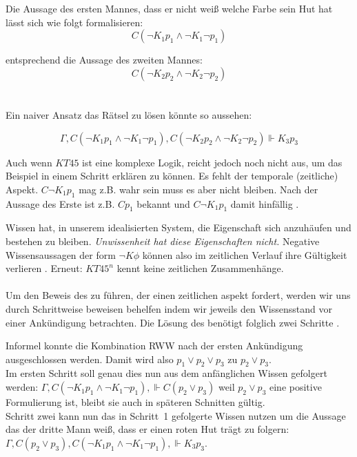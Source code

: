 Die Aussage des ersten Mannes, dass er nicht weiß welche Farbe sein Hut hat lässt sich wie folgt formalisieren:
\begin{equation*}
	C(\neg K_1 p_1 \wedge \neg K_1 \neg p_1)
\end{equation*}

entsprechend die Aussage des zweiten Mannes:
\begin{equation*}
	C(\neg K_2 p_2 \wedge \neg K_2 \neg p_2)
\end{equation*}
\\\\

Ein naiver Ansatz das Rätsel zu lösen könnte so aussehen:

\begin{equation}
	\Gamma, C(\neg K_1 p_1 \wedge \neg K_1 \neg p_1), C(\neg K_2 p_2 \wedge \neg K_2 \neg p_2) \Vdash K_3 p_3
\end{equation}

Auch wenn $KT45$ ist eine komplexe Logik, reicht jedoch noch nicht aus, um das Beispiel in einem Schritt erklären zu können.
Es fehlt der temporale (zeitliche) Aspekt.
$C \neg K_1 p_1$ mag z.B. wahr sein muss es aber nicht bleiben.
Nach der Aussage des Erste ist z.B. $C p_1$ bekannt und $C \neg K_1 p_1$ damit hinfällig .

Wissen hat, in unserem idealisierten System, die Eigenschaft sich anzuhäufen und bestehen zu bleiben. 
\emph{Unwissenheit hat diese Eigenschaften nicht.}
Negative Wissensaussagen der form $\neg K \phi$ können also im zeitlichen Verlauf ihre Gültigkeit verlieren .
Erneut: $KT45^n$ kennt keine zeitlichen Zusammenhänge.\\\\

Um den Beweis des \WMRs zu führen, der einen zeitlichen aspekt fordert, werden wir uns durch Schrittweise beweisen behelfen indem wir jeweils den Wissensstand vor einer Ankündigung betrachten.
Die Lösung des \WMRs benötigt folglich zwei Schritte .

Informel konnte die Kombination RWW nach der ersten Ankündigung ausgeschlossen werden.
Damit wird also $p_1 \vee p_2 \vee p_3$ zu $p_2 \vee p_3$.\\
Im ersten Schritt soll genau dies nun aus dem anfänglichen Wissen gefolgert werden:
$\Gamma, C(\neg K_1 p_1 \wedge \neg K_1 \neg p_1), \Vdash C(p_2 \vee p_3)$
weil $p_2 \vee p_3$ eine positive Formulierung ist, bleibt sie auch in späteren Schnitten gültig.\\
Schritt zwei kann nun das in Schritt~1 gefolgerte Wissen nutzen um die Aussage das der dritte Mann weiß, dass er einen roten Hut trägt zu folgern:
$\Gamma, C(p_2 \vee p_3), C(\neg K_1 p_1 \wedge \neg K_1 \neg p_1), \Vdash K_3 p_3$.\\\\

